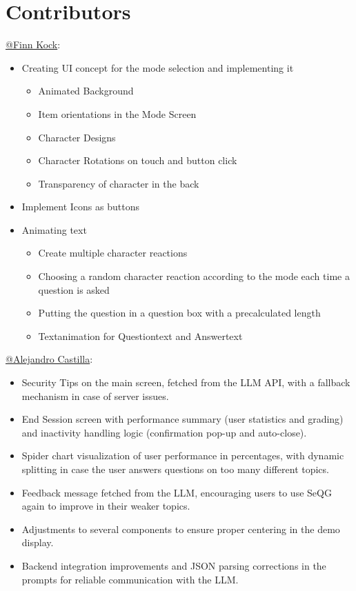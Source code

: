 \section{Contributors}

\href{https://github.com/finnkock}{@Finn Kock}: 
\begin{itemize}
	\item Creating UI concept for the mode selection and implementing it
    \begin{itemize}
        \item Animated Background
	    \item Item orientations in the Mode Screen
	    \item  Character Designs
	    \item Character Rotations on touch and button click
	    \item Transparency of character in the back
    \end{itemize}
	\item Implement Icons as buttons
	\item Animating text 
	\begin{itemize}
        \item Create multiple character reactions
        \item Choosing a random character reaction according to the mode each time a question is asked
        \item Putting the question in a question box with a precalculated length
        \item Textanimation for Questiontext and Answertext
	\end{itemize}
\end{itemize}

\href{https://github.com/alecasbar}{@Alejandro Castilla}: 
\begin{itemize}
    \item Security Tips on the main screen, fetched from the LLM API, with a fallback mechanism in case of server issues.
    \item End Session screen with performance summary (user statistics and grading) and inactivity handling logic (confirmation pop-up and auto-close).
    \item Spider chart visualization of user performance in percentages, with dynamic splitting in case the user answers questions on too many different topics.
    \item Feedback message fetched from the LLM, encouraging users to use SeQG again to improve in their weaker topics.
    \item Adjustments to several components to ensure proper centering in the demo display.
    \item Backend integration improvements and JSON parsing corrections in the prompts for reliable communication with the LLM.
\end{itemize}

